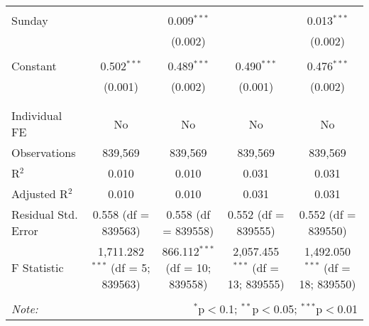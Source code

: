 \documentclass[
]{article}
\begin{document}
\begin{table}[!htbp]
{\begin{tabular}{@{\extracolsep{5pt}}lcccc}
  & & & & \\ 
 Sunday &  & 0.009$^{***}$ &  & 0.013$^{***}$ \\ 
  &  & (0.002) &  & (0.002) \\ 
  & & & & \\ 
 Constant & 0.502$^{***}$ & 0.489$^{***}$ & 0.490$^{***}$ & 0.476$^{***}$ \\ 
  & (0.001) & (0.002) & (0.001) & (0.002) \\ 
  & & & & \\ 
\hline \\[-1.8ex] 
Individual FE & No & No & No & No \\ 
Observations & 839,569 & 839,569 & 839,569 & 839,569 \\ 
R$^{2}$ & 0.010 & 0.010 & 0.031 & 0.031 \\ 
Adjusted R$^{2}$ & 0.010 & 0.010 & 0.031 & 0.031 \\ 
Residual Std. Error & 0.558 (df = 839563) & 0.558 (df = 839558) & 0.552 (df = 839555) & 0.552 (df = 839550) \\ 
F Statistic & 1,711.282$^{***}$ (df = 5; 839563) & 866.112$^{***}$ (df = 10; 839558) & 2,057.455$^{***}$ (df = 13; 839555) & 1,492.050$^{***}$ (df = 18; 839550) \\ 
\hline 
\hline \\[-1.8ex] 
\textit{Note:}  & \multicolumn{4}{r}{$^{*}$p$<$0.1; $^{**}$p$<$0.05; $^{***}$p$<$0.01} \\ 
\end{tabular}
} 
\end{table} 
\newpage
\end{document}
